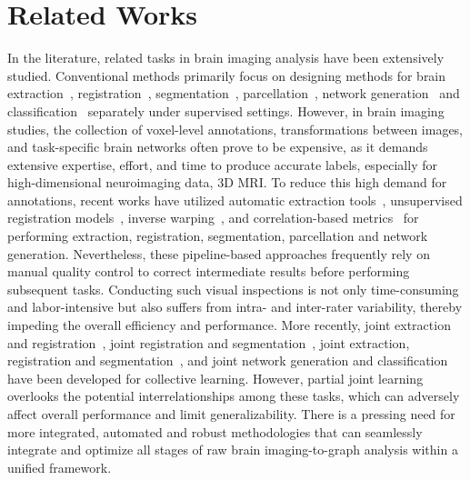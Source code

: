 \section{Related Works}
\label{sec:related}
In the literature, related tasks in brain imaging analysis have been extensively studied. Conventional methods primarily focus on designing methods for brain extraction~\cite{kleesiek2016deep,lucena2019convolutional}, registration~\cite{sokooti2017nonrigid, su2022abn}, segmentation~\cite{akkus2017deep, kamnitsas2017efficient, chen2018voxresnet}, parcellation~\cite{thyreau2020learning,lim2022deepparcellation}, network generation~\cite{vskoch2022human, yin2023multi} and classification~\cite{li2021braingnn,kawahara2017brainnetcnn, kan2022brain} separately under supervised settings. However, in brain imaging studies, the collection of voxel-level annotations, transformations between images, and task-specific brain networks often prove to be expensive, as it demands extensive expertise, effort, and time to produce accurate labels, especially for high-dimensional neuroimaging data, \eg 3D MRI. To reduce this high demand for annotations, recent works have utilized automatic extraction tools~\cite{smith2002fast,cox1996afni,shattuck2002brainsuite, segonne2004hybrid}, unsupervised registration models~\cite{balakrishnan2018unsupervised,su2022abn}, inverse warping~\cite{jaderberg2015spatial}, and correlation-based metrics~\cite{liang2012effects} for performing extraction, registration, segmentation, parcellation and network generation. Nevertheless, these pipeline-based approaches frequently rely on manual quality control to correct intermediate results before performing subsequent tasks. Conducting such visual inspections is not only time-consuming and labor-intensive but also suffers from intra- and inter-rater variability, thereby impeding the overall efficiency and performance. More recently, joint extraction and registration~\cite{su2022ernet}, joint registration and segmentation~\cite{xu2019deepatlas}, joint extraction, registration and segmentation~\cite{su2023one}, and joint network generation and classification~\cite{kan2022fbnetgen} have been developed for collective learning. However, partial joint learning overlooks the potential interrelationships among these tasks, which can adversely affect overall performance and limit generalizability. There is a pressing need for more integrated, automated and robust methodologies that can seamlessly integrate and optimize all stages of raw brain imaging-to-graph analysis within a unified framework.
